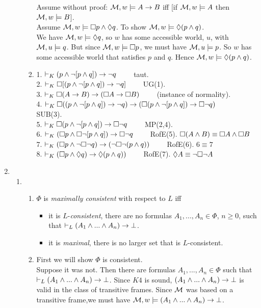 \documentclass[a4paper, draft, 12pt]{article}
\begin{document}
\begin{enumerate}
\begin{enumerate}
\begin{enumerate}
  Assume without proof: $\mathcal{M}, w \models A \rightarrow B$ iff [if $\mathcal{M}, w \models A$ then $\mathcal{M}, w \models B$].\\
  Assume $\mathcal{M}, w \models \square p \wedge \Diamond q$. To show $\mathcal{M}, w \models \Diamond (p \wedge q)$. \\
  We have $\mathcal{M}, w \models \Diamond q$, so $w$ has some accessible world, $u$, with $\mathcal{M}, u \models q$. 
  But since $\mathcal{M}, w \models \square p$, we must have $\mathcal{M}, u \models p$. So $w$ has 
  some accessible world that satisfies $p$ and $q$. Hence $\mathcal{M}, w \models \Diamond (p \wedge q)$.
  \item %
  1. $\vdash_K (p \wedge \neg [p \wedge q]) \rightarrow \neg q \qquad$ taut. \\
  2. $\vdash_K \square [(p \wedge \neg [p \wedge q]) \rightarrow \neg q] \qquad$ UG(1). \\
  3. $\vdash_K \square (A \rightarrow B) \rightarrow (\square A \rightarrow \square B) \qquad$ (instance of normality). \\
  4. $\vdash_K \square ((p \wedge \neg [p \wedge q]) \rightarrow \neg q) 
  \rightarrow (\square (p \wedge \neg [p \wedge q]) \rightarrow \square \neg q) \qquad$ SUB(3). \\
  5. $\vdash_K \square (p \wedge \neg [p \wedge q]) \rightarrow \square \neg q \qquad$ MP(2,4). \\
  6. $\vdash_K  (\square p \wedge \square \neg [p \wedge q]) \rightarrow \square \neg q \qquad$ RofE(5). 
  $\square (A \wedge B) \equiv \square A \wedge \square B$ \\
  7. $\vdash_K  (\square p \wedge \neg \square \neg q) \rightarrow (\neg \square \neg (p \wedge q))  \qquad$ RofE(6). $6 \equiv 7$\\
  8. $\vdash_K  (\square p \wedge \Diamond q) \rightarrow \Diamond (p \wedge q))  \qquad$ RofE(7). $\Diamond A \equiv \neg \square \neg A$
  \end{enumerate}
\end{enumerate}
\item %
\begin{enumerate}
\item %
  \begin{enumerate}
  \item %
  $\Phi$ is \textit{maximally consistent} with respect to $L$ iff 
  \begin{itemize}
  \item it is $L$-\textit{consistent}, there are no formulas $A_1, ..., A_n \in \Phi$, 
  $n \geqslant 0$, such that $\vdash_{L} (A_1 \wedge ... \wedge A_n) \rightarrow \bot$.
  \item it is \textit{maximal}, there is no larger set that is $L$-consistent.
  \end{itemize}
  \item %
  First we will show $\Phi$ is consistent. \\
  Suppose it was not.
  Then there are formulas $A_1, ..., A_n \in \Phi$ 
  such that $\vdash_{L} (A_1 \wedge ... \wedge A_n) \rightarrow \bot$. 
  Since $K4$ is sound, $(A_1 \wedge ... \wedge A_n) \rightarrow \bot$ is valid 
  in the class of transitive frames. Since $\mathcal{M}$ 
  was based on a transitive frame,we must have $\mathcal{M}, w \models (A_1 \wedge ... \wedge A_n) \rightarrow \bot$.


\end{enumerate}
\end{enumerate}
\end{enumerate}
\end{document}
